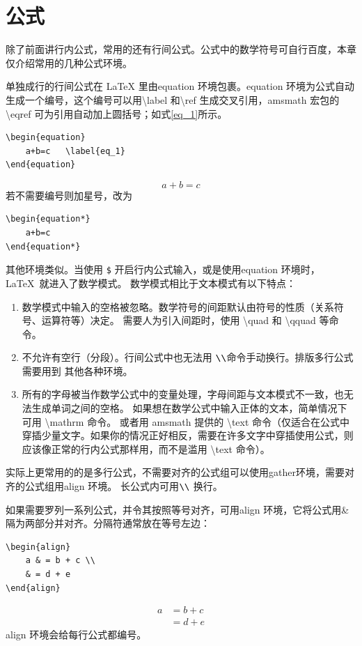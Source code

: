 \section{公式}
除了前面讲行内公式，常用的还有行间公式。公式中的数学符号可自行百度，本章仅介绍常用的几种公式环境。

单独成行的行间公式在 \LaTeX{} 里由equation 环境包裹。equation 环境为公式自动生成一个编号，这个编号可以用\textbackslash{}label 和\textbackslash{}ref 生成交叉引用，amsmath 宏包的\textbackslash{}eqref 可为引用自动加上圆括号；如式\eqref{eq_1}所示。
\begin{lstlisting}
\begin{equation}
	a+b=c	\label{eq_1}
\end{equation}
\end{lstlisting}
\begin{equation}
	a+b=c	\label{eq_1}
\end{equation}
若不需要编号则加星号，改为
\begin{lstlisting}
\begin{equation*}
	a+b=c
\end{equation*}
\end{lstlisting}
其他环境类似。当使用 \texttt\$ 开启行内公式输入，或是使用{equation} 环境时，\LaTeX\ 就进入了数学模式。
数学模式相比于文本模式有以下特点：
\begin{enumerate}
	\item 数学模式中输入的空格被忽略。数学符号的间距默认由符号的性质（关系符号、运算符等）决定。
	需要人为引入间距时，使用 \textbackslash{}{quad} 和 \textbackslash{}{qquad} 等命令。
	\item {不允许有空行（分段）}。行间公式中也无法用 $ \verb|\\|$命令手动换行。排版多行公式需要用到 其他各种环境。
	\item 所有的字母被当作数学公式中的变量处理，字母间距与文本模式不一致，也无法生成单词之间的空格。
	如果想在数学公式中输入正体的文本，简单情况下可用 \textbackslash{}{mathrm} 命令。
	或者用 {amsmath} 提供的 \textbackslash{}{text} 命令（仅适合在公式中穿插少量文字。如果你的情况正好相反，需要在许多文字中穿插使用公式，则应该像正常的行内公式那样用，而不是滥用 \textbackslash{}{text} 命令）。
\end{enumerate}	

实际上更常用的的是多行公式，不需要对齐的公式组可以使用gather环境，需要对齐的公式组用align 环境。
长公式内可用$ \verb|\\|$ 换行。

如果需要罗列一系列公式，并令其按照等号对齐，可用align 环境，它将公式用\& 隔为两部分并对齐。分隔符通常放在等号左边：
\begin{lstlisting}
\begin{align}
	a & = b + c \\
	& = d + e
\end{align}
\end{lstlisting}
\begin{align}
a & = b + c \\
& = d + e
\end{align}
align 环境会给每行公式都编号。

